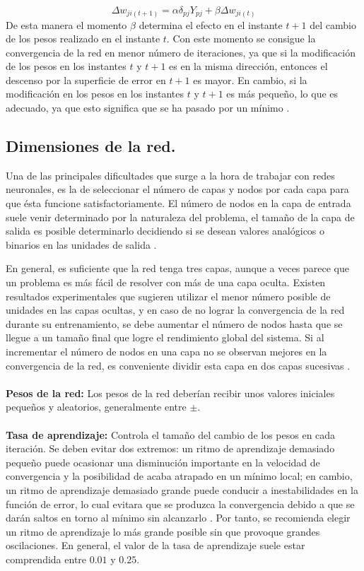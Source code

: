 \documentclass[12pt,letterpaper,oneside,openright]{book}
\begin{document}
 	\begin{equation}
 		\Delta w_{ji(t+1)} = \alpha \delta_{pj} Y_{pj} + \beta \Delta w_{ji(t)}
 	\end{equation}
 	De esta manera el momento $\beta$ determina el efecto en el instante $t+1$ del cambio de los pesos realizado en el instante $t$. Con este momento se consigue la convergencia de la red en menor número de iteraciones, ya que si la modificación de los pesos en los instantes $t$ y $t+1$ es en la misma dirección, entonces el descenso por la superficie de error en $t+1$ es mayor. En cambio, si la modificación en los pesos en los instantes $t$ y $t+1$ es más pequeño, lo que es adecuado, ya que esto significa que se ha pasado por un mínimo \cite{stephani}.
 	
 	\subsection{Dimensiones de la red.}
 	Una de las principales dificultades que surge a la hora de trabajar con redes neuronales, es la de seleccionar el número de capas y nodos por cada capa para que ésta funcione satisfactoriamente. El número de nodos en la capa de entrada suele venir determinado por la naturaleza del problema, el tamaño de la capa de salida es posible determinarlo decidiendo si se desean valores analógicos o binarios en las unidades de salida \cite{stephani}.
 	
 	En general, es suficiente que la red tenga tres capas, aunque a veces parece que un problema es más fácil de resolver con más de una capa oculta. Existen resultados experimentales que sugieren utilizar el menor número posible de unidades en las capas ocultas, y en caso de no lograr la convergencia de la red durante su entrenamiento, se debe aumentar el número de nodos hasta que se llegue a un tamaño final que logre el rendimiento global del sistema. Si al incrementar el número de nodos en una capa no se observan mejores en la convergencia de la red, es conveniente dividir esta capa en dos capas sucesivas \cite{perceptron}.
	\\ \\
	\textbf{Pesos de la red:} Los pesos de la red deberían recibir unos valores iniciales pequeños y aleatorios, generalmente entre $\pm$.\\ \\
	\textbf{Tasa de aprendizaje:} Controla el tamaño del cambio de los pesos en cada iteración. Se deben evitar dos extremos: un ritmo de aprendizaje demasiado pequeño puede ocasionar una disminución importante en la velocidad de convergencia y la posibilidad de acaba atrapado en un mínimo local; en cambio, un ritmo de aprendizaje demasiado grande puede conducir a inestabilidades en la función de error, lo cual evitara que se produzca la convergencia debido a que se darán saltos en torno al mínimo sin alcanzarlo \cite{nnApli,stephani}. Por tanto, se recomienda elegir un ritmo de aprendizaje lo más grande posible sin que provoque grandes oscilaciones. En general, el valor de la tasa de aprendizaje suele estar comprendida entre $0.01$ y $0.25$.
\end{document}

